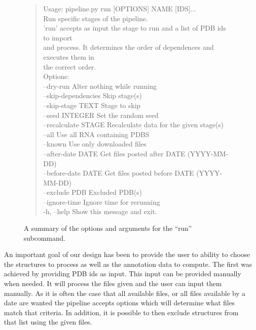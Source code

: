 \begin{figure}
\begin{quote}
Usage: pipeline.py run [OPTIONS] NAME [IDS]... \\

  Run specific stages of the pipeline. \\

  'run' accepts as input the stage to run and a list of PDB ids to import \\
  and process. It determines the order of dependences and executes them in \\
  the correct order. \\

Options: \\
  --dry-run            Alter nothing while running \\
  --skip-dependencies  Skip stage(s) \\
  --skip-stage TEXT    Stage to skip \\
  --seed INTEGER       Set the random seed \\
  --recalculate STAGE  Recalculate data for the given stage(s) \\
  --all                Use all RNA containing PDBS \\
  --known              Use only downloaded files \\
  --after-date DATE    Get files posted after DATE (YYYY-MM-DD) \\
  --before-date DATE   Get files posted before DATE (YYYY-MM-DD) \\
  --exclude PDB        Excluded PDB(s) \\
  --ignore-time        Ignore time for rerunning \\
  -h, --help           Show this message and exit. \\
\end{quote}
\caption{A summary of the options and arguments for the ``run'' subcommand.}
\label{fig:running-options}
\end{figure}

An important goal of our design has been to provide the user to ability to
choose the structures to process as well as the annotation data to compute. The
first was achieved by providing PDB ids as input. This input can be provided
manually when needed. It will process the files given and the user can input
them manually. As it is often the case that all available files, or all files
available by a date are wanted the pipeline accepts options which will determine
what files match that criteria. In addition, it is possible to then exclude
structures from that list using the given files.

